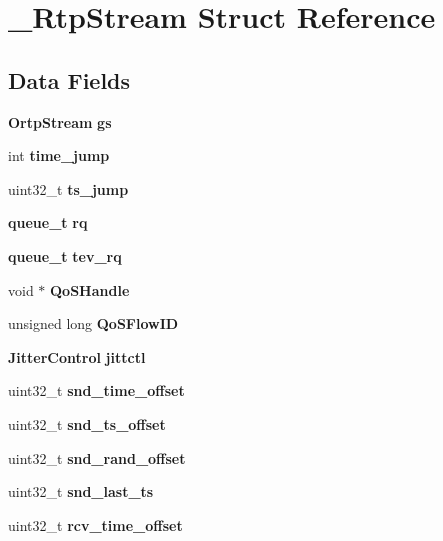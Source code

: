 \section{\+\_\+\+Rtp\+Stream Struct Reference}
\label{struct__RtpStream}
\subsection*{Data Fields}
\begin{DoxyCompactItemize}
\item 
\mbox{\label{struct__RtpStream_a05d553645d22770ce9c56f345e7c47a9}} 
\textbf{ Ortp\+Stream} {\bfseries gs}
\item 
\mbox{\label{struct__RtpStream_a7acc1dd91a64c7d5dbf5bde512f841d9}} 
int {\bfseries time\+\_\+jump}
\item 
\mbox{\label{struct__RtpStream_a271de87373b4de23ad47e4a9b870d1a4}} 
uint32\+\_\+t {\bfseries ts\+\_\+jump}
\item 
\mbox{\label{struct__RtpStream_ab57ee13b7733b5cf49d31e5ebbbcb504}} 
\textbf{ queue\+\_\+t} {\bfseries rq}
\item 
\mbox{\label{struct__RtpStream_ada87974ccf5884c34b7a04110a144d28}} 
\textbf{ queue\+\_\+t} {\bfseries tev\+\_\+rq}
\item 
\mbox{\label{struct__RtpStream_ac3fc7af632bcd3af6dd7451efa2ab77c}} 
void $\ast$ {\bfseries Qo\+S\+Handle}
\item 
\mbox{\label{struct__RtpStream_a37512e40db1bcf5255b74803b2bfd7c9}} 
unsigned long {\bfseries Qo\+S\+Flow\+ID}
\item 
\mbox{\label{struct__RtpStream_a3b039fd2ee3ce676a9cefb32b1a93022}} 
\textbf{ Jitter\+Control} {\bfseries jittctl}
\item 
\mbox{\label{struct__RtpStream_a2eebd059f4f3910cfa378132ede85da1}} 
uint32\+\_\+t {\bfseries snd\+\_\+time\+\_\+offset}
\item 
\mbox{\label{struct__RtpStream_aa3a7cdac46b8c818598e15cd78eec11c}} 
uint32\+\_\+t {\bfseries snd\+\_\+ts\+\_\+offset}
\item 
\mbox{\label{struct__RtpStream_a758bf0a21191e13ebbb50eea38236e08}} 
uint32\+\_\+t {\bfseries snd\+\_\+rand\+\_\+offset}
\item 
\mbox{\label{struct__RtpStream_ac8b44e94973af102fcd0ff72d6b6f948}} 
uint32\+\_\+t {\bfseries snd\+\_\+last\+\_\+ts}
\item 
\mbox{\label{struct__RtpStream_a601041ec92986121324a9688602d2fcc}} 
uint32\+\_\+t {\bfseries rcv\+\_\+time\+\_\+offset}

\end{DoxyCompactItemize}

